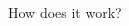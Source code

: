 \documentclass[11pt]{beamer}
\begin{document}
\begin{frame}[c,fragile]{How does it work?}

    \begin{columns}
        \begin{column}[c]{0.5\textwidth}
            \centering

\end{column}
\end{columns}
\end{frame}
\end{document}

